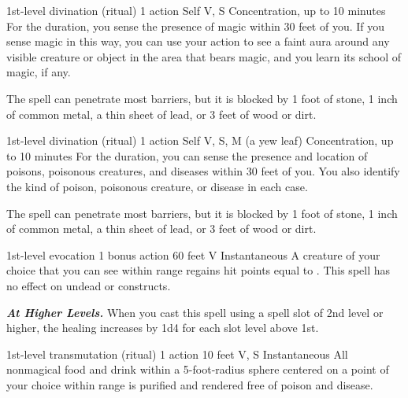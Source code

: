\documentclass[10pt,twoside,twocolumn,openany]{book}
\newcommand{\castingModifier}{3}
\newcommand\impact[1]{
	\textbf{\textit{#1}}
}
\begin{document}
{1st-level divination {\color{ritual}(ritual)}}
{\color{action} 1 action}
{Self}
{V, S}
{{\color{concentration}Concentration}, up to 10 minutes}
%
For the duration, you sense the presence of magic
within 30 feet of you. If you sense magic in this way, you can use your action to see a faint aura around any visible creature or object in the area that bears magic, and you learn its school of magic, if any.

The spell can penetrate most barriers, but it is blocked by 1 foot of stone, 1 inch of common metal, a thin sheet of lead, or 3 feet of wood or dirt.

{1st-level divination {\color{ritual}(ritual)}}
{\color{action} 1 action}
{Self}
{V, S, M (a yew leaf)}
{{\color{concentration}Concentration}, up to 10 minutes}
%
For the duration, you can sense the presence and location of poisons, poisonous creatures, and diseases within 30 feet of you. You also identify the kind of poison, poisonous creature, or disease in each case.

The spell can penetrate most barriers, but it is blocked by 1 foot of stone, 1 inch of common metal, a thin sheet of lead, or 3 feet of wood or dirt.

{1st-level evocation}
{\color{bonusaction} 1 bonus action}
{60 feet}
{V}
{Instantaneous}
%
A creature of your choice that you can see within range regains hit points equal to \dice{1d4 + \castingModifier}. This spell has no effect on undead or constructs.

\impact{At Higher Levels.} When you cast this spell using a spell slot of 2nd level or higher, the healing increases by 1d4 for each slot level above 1st.

{1st-level transmutation {\color{ritual}(ritual)}}
{\color{action} 1 action}
{10 feet}
{V, S}
{Instantaneous}
%
All nonmagical food and drink within a 5-foot-radius sphere centered on a point of your choice within range is purified and rendered free of poison and disease.

\printindex
\printindex[cr]
\end{document}
